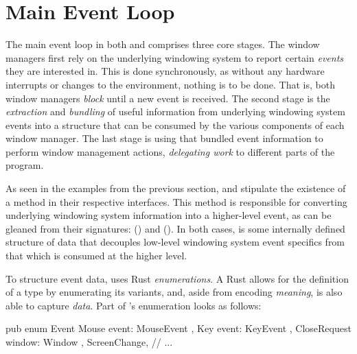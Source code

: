 \section{Main Event Loop}\label{maineventloop}

The main event loop in both \wmrs and \wmcpp comprises three core stages. The
window managers first rely on the underlying windowing system to report certain
\textit{events} they are interested in. This is done synchronously, as without
any hardware interrupts or changes to the environment, nothing is to be done.
That is, both window managers \textit{block} until a new event is received.
The second stage is the \textit{extraction} and \textit{bundling} of useful
information from underlying windowing system events into a structure that can
be consumed by the various components of each window manager. The last stage
is using that bundled event information to perform window management actions,
\textit{delegating work} to different parts of the program.


As seen in the examples from the previous section, \wmrs and \wmcpp stipulate
the existence of a  method in their respective 
interfaces. This method is responsible for converting underlying windowing
system information into a higher-level event, as can be gleaned from their
signatures:  (\wmrs) and  (\wmcpp). In both cases,  is some internally defined
structure of data that decouples low-level windowing system event specifics from
that which is consumed at the higher level.



To structure event data, \wmrs uses Rust \textit{enumerations}. A Rust
 allows for the definition of a type by enumerating its variants,
and, aside from encoding \textit{meaning}, is also able to capture
\textit{data}\cite{therustbook}. Part of \wmrs's  enumeration looks
as follows:

\begin{rustblock}
  pub enum Event {
    Mouse { event: MouseEvent },
    Key { event: KeyEvent },
    CloseRequest { window: Window },
    ScreenChange,
    // ...
  }
\end{rustblock}

